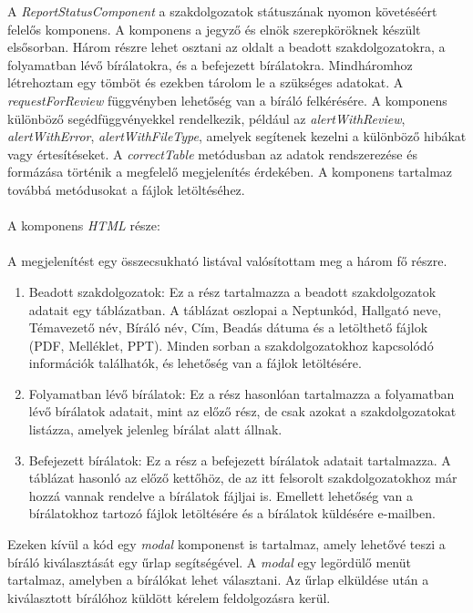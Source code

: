 A \textit{ReportStatusComponent} a szakdolgozatok státuszának nyomon követéséért felelős komponens. A komponens a jegyző és elnök szerepköröknek készült elsősorban. Három részre lehet osztani az oldalt a beadott szakdolgozatokra, a folyamatban lévő bírálatokra, és a befejezett bírálatokra. Mindháromhoz létrehoztam egy tömböt és ezekben tárolom le a szükséges adatokat. A \textit{requestForReview} függvényben lehetőség van a bíráló felkérésére. A komponens különböző segédfüggvényekkel rendelkezik, például az \textit{alertWithReview}, \textit{alertWithError}, \textit{alertWithFileType}, amelyek segítenek kezelni a különböző hibákat vagy értesítéseket. A \textit{correctTable} metódusban az adatok rendszerezése és formázása történik a megfelelő megjelenítés érdekében. A komponens tartalmaz továbbá metódusokat a fájlok letöltéséhez.\\
\\
A komponens \textit{HTML} része:\\
\\
A megjelenítést egy összecsukható listával valósítottam meg a három fő részre.
\\
\begin{enumerate}

\item{} Beadott szakdolgozatok: Ez a rész tartalmazza a beadott szakdolgozatok adatait egy táblázatban. A táblázat oszlopai a Neptunkód, Hallgató neve, Témavezető név, Bíráló név, Cím, Beadás dátuma és a letölthető fájlok (PDF, Melléklet, PPT). Minden sorban a szakdolgozatokhoz kapcsolódó információk találhatók, és lehetőség van a fájlok letöltésére.

\item{} Folyamatban lévő bírálatok: Ez a rész hasonlóan tartalmazza a folyamatban lévő bírálatok adatait, mint az előző rész, de csak azokat a szakdolgozatokat listázza, amelyek jelenleg bírálat alatt állnak.

\item{} Befejezett bírálatok: Ez a rész a befejezett bírálatok adatait tartalmazza. A táblázat hasonló az előző kettőhöz, de az itt felsorolt szakdolgozatokhoz már hozzá vannak rendelve a bírálatok fájljai is. Emellett lehetőség van a bírálatokhoz tartozó fájlok letöltésére és a bírálatok küldésére e-mailben.\\
\end{enumerate}
Ezeken kívül a kód egy \textit{modal} komponenst is tartalmaz, amely lehetővé teszi a bíráló kiválasztását egy űrlap segítségével. A \textit{modal} egy legördülő menüt tartalmaz, amelyben a bírálókat lehet választani. Az űrlap elküldése után a kiválasztott bírálóhoz küldött kérelem feldolgozásra kerül.

